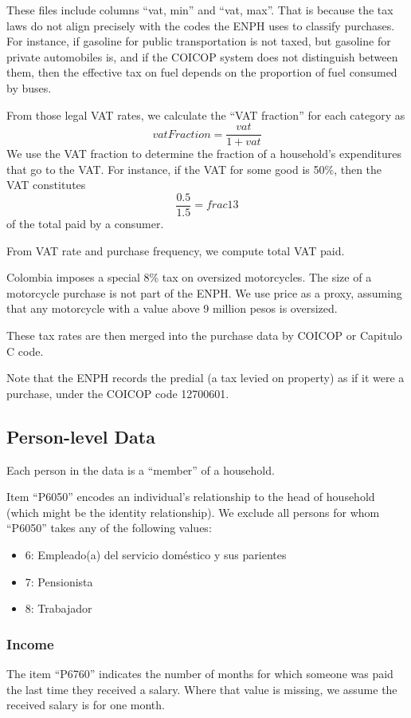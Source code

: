 \documentclass[12pt]{article}
\begin{document}
\begin{appendices}
These files include columns ``vat, min'' and ``vat, max''.
That is because the tax laws do not align precisely with the codes the ENPH uses to classify purchases.
For instance, if gasoline for public transportation is not taxed,
but gasoline for private automobiles is,
and if the COICOP system does not distinguish between them,
then the effective tax on fuel depends on the proportion of fuel consumed by buses.

From those legal VAT rates,
we calculate the ``VAT fraction'' for each category as
\begin{equation}
  vatFraction = \frac{vat}{1 + vat}
\end{equation}
We use the VAT fraction to determine
the fraction of a household's expenditures that go to the VAT.
For instance, if the VAT for some good is 50\%, then the VAT constitutes
\begin{equation}
  \frac{0.5}{1.5} = frac{1}{3}
\end{equation}
of the total paid by a consumer.

From VAT rate and purchase frequency, we compute total VAT paid.

Colombia imposes a special 8\% tax on oversized motorcycles.
The size of a motorcycle purchase is not part of the ENPH.
We use price as a proxy, assuming that
any motorcycle with a value above 9 million pesos is oversized.

These tax rates are then merged into the purchase data
by COICOP or Capitulo C code.

Note that the ENPH records the predial (a tax levied on property)
as if it were a purchase, under the COICOP code 12700601.


\subsection{Person-level Data}
Each person in the data is a ``member'' of a household.

Item ``P6050'' encodes an individual's relationship to the head of household
(which might be the identity relationship).
We exclude all persons for whom ``P6050'' takes any of the following values:
\begin{itemize}
\item 6: Empleado(a) del servicio doméstico y sus parientes
\item 7: Pensionista
\item 8: Trabajador
\end{itemize}

\subsubsection{Income}
The item ``P6760'' indicates the number of months
for which someone was paid the last time they received a salary.
Where that value is missing, we assume the received salary is for one month.


\end{appendices}
\end{document}

